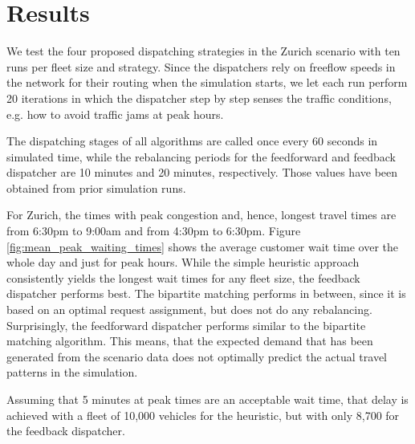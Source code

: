 \section{Results}
\label{sec:results}

We test the four proposed dispatching strategies in the Zurich scenario with ten
runs per fleet size and strategy. Since the dispatchers rely on freeflow speeds in the network
for their routing when the simulation starts, we let each run perform 20 iterations
in which the dispatcher step by step senses the traffic conditions, e.g. how to
avoid traffic jams at peak hours.

The dispatching stages of all algorithms are called once every 60 seconds in
simulated time, while the rebalancing periods for the feedforward and feedback
dispatcher are 10 minutes and 20 minutes, respectively. Those values have been
obtained from prior simulation runs.

For Zurich, the times with peak congestion and, hence, longest travel times
are from 6:30pm to 9:00am and from 4:30pm to 6:30pm. Figure \ref{fig:mean_peak_waiting_times}
shows the average customer wait time over the whole day and just for peak hours.
While the simple heuristic approach consistently yields the longest wait times
for any fleet size, the feedback dispatcher performs best. The bipartite matching
performs in between, since it is based on an optimal request assignment, but does
not do any rebalancing. Surprisingly, the feedforward dispatcher performs similar
to the bipartite matching algorithm. This means, that the expected demand that
has been generated from the scenario data does not optimally predict the actual
travel patterns in the simulation.

Assuming that 5 minutes at peak times are an acceptable wait time, that delay is
achieved with a fleet of 10,000 vehicles for the heuristic, but with only 8,700
for the feedback dispatcher.

